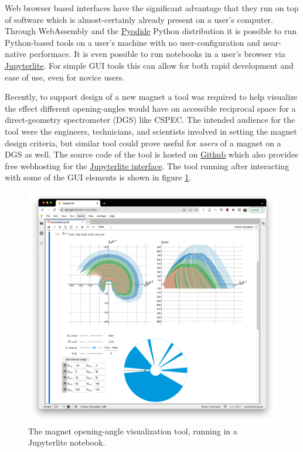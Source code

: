 \documentclass[a4paper, twocolumn, 10pt, revision]{ess}
\begin{document}
Web browser based interfaces have the significant advantage that they run on top of software which is almost-certainly
already present on a user's computer.
Through WebAssembly and the \href{https://pyodide.org/}{Pyodide} Python distribution it is possible
to run Python-based tools on a user's machine with no user-configuration and near-native performace.
It is even possible to run notebooks in a user's browser via \href{https://jupyterlite.readthedocs.io/}{Jupyterlite}.
For simple GUI tools this can allow for both rapid development and ease of use, even for novice users.

Recently, to support design of a new magnet a tool was required to help visualize the effect different opening-angles would have on accessible reciprocal space
for a direct-geometry spectrometer (DGS) like CSPEC.
The intended audience for the tool were the engineers, technicians, and scientists involved in setting the magnet design criteria,
but similar tool could prove useful for \emph{users} of a magnet on a DGS as well.
The source code of the tool is hosted on
\href{https://github.com/g5t/tof-tools/}{Github}
which also provides free webhosting for the
\href{https://g5t.github.io/tof-tools/lab?path=accessible.ipynb}{Jupyterlite interface}.
The tool running after interacting with some of the GUI elements is shown in figure \ref{fig:tof-tool}.

\begin{figure}
\begin{centering}
	\includegraphics[width=\columnwidth]{tof-tool}
\end{centering}
\caption{The magnet opening-angle visualization tool, running in a Jupyterlite notebook. \label{fig:tof-tool}}
\end{figure}






\printbibliography
\end{document}

